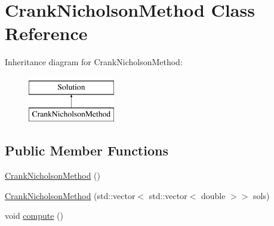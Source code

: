 \hypertarget{class_crank_nicholson_method}{}\section{Crank\+Nicholson\+Method Class Reference}
\label{class_crank_nicholson_method}
Inheritance diagram for Crank\+Nicholson\+Method\+:\begin{figure}[H]
\begin{center}
\leavevmode
\includegraphics[height=2.000000cm]{class_crank_nicholson_method}
\end{center}
\end{figure}
\subsection*{Public Member Functions}
\begin{DoxyCompactItemize}
\item 
\hyperlink{class_crank_nicholson_method_ae5052444cd3f042a554bb74d9ac556e0}{Crank\+Nicholson\+Method} ()
\item 
\hyperlink{class_crank_nicholson_method_a9738c40cac3d4f37775d6211544b178f}{Crank\+Nicholson\+Method} (std\+::vector$<$ std\+::vector$<$ double $>$$>$ sols)
\item 
void \hyperlink{class_crank_nicholson_method_a10558e5238673e11a76b4e10e8c588b4}{compute} ()
\end{DoxyCompactItemize}
